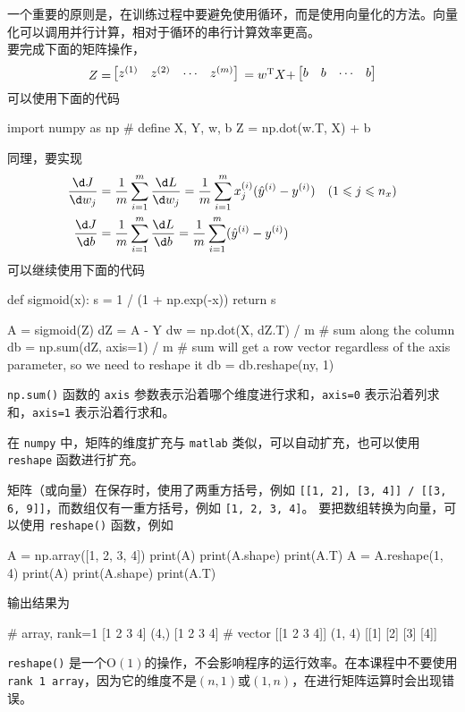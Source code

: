 一个重要的原则是，在训练过程中要避免使用循环，而是使用向量化的方法。向量化可以调用并行计算，相对于循环的串行计算效率更高。\\
要完成下面的矩阵操作，
\begin{equation}
    \vcenter{\hbox{$\vphantom{z^{(1)}}Z =$}}
    \begin{bmatrix}
        z^{(1)} & z^{(2)} & \cdots & z^{(m)}
    \end{bmatrix}
    \vcenter{\hbox{$\vphantom{z^{(1)}}= w^\mathrm{T} X + $}}
    \begin{bmatrix}
        b & b & \cdots & b
    \end{bmatrix}
\end{equation}
可以使用下面的代码
\begin{python}
import numpy as np
# define X, Y, w, b
Z = np.dot(w.T, X) + b
\end{python}
同理，要实现
\begin{equation}
    \begin{aligned}
        \frac{\d J}{\d w_j} &= \frac{1}{m} \sum_{i=1}^{m} \frac{\d L}{\d w_j} = \frac{1}{m} \sum_{i=1}^{m} x_j^{(i)} (\hat{y}^{(i)} - y^{(i)}) \quad (1 \leqslant j \leqslant n_x)\\
        \frac{\d J}{\d b} &= \frac{1}{m} \sum_{i=1}^{m} \frac{\d L}{\d b} = \frac{1}{m} \sum_{i=1}^{m} (\hat{y}^{(i)} - y^{(i)})
    \end{aligned}
\end{equation}
可以继续使用下面的代码
\begin{python}
def sigmoid(x):
    s = 1 / (1 + np.exp(-x))
    return s


A = sigmoid(Z)
dZ = A - Y
dw = np.dot(X, dZ.T) / m
# sum along the column
db = np.sum(dZ, axis=1) / m
# sum will get a row vector regardless of the axis parameter, so we need to reshape it
db = db.reshape(ny, 1)
\end{python}
\verb|np.sum()| 函数的 \verb|axis| 参数表示沿着哪个维度进行求和，\verb|axis=0| 表示沿着列求和，\verb|axis=1| 表示沿着行求和。

在 \verb|numpy| 中，矩阵的维度扩充与 \verb|matlab| 类似，可以自动扩充，也可以使用 \verb|reshape| 函数进行扩充。

矩阵（或向量）在保存时，使用了两重方括号，例如 \verb|[[1, 2], [3, 4]] / [[3, 6, 9]]|，而数组仅有一重方括号，例如 \verb|[1, 2, 3, 4]|。
要把数组转换为向量，可以使用 \verb|reshape()| 函数，例如
\begin{python}
A = np.array([1, 2, 3, 4])
print(A)
print(A.shape)
print(A.T)
A = A.reshape(1, 4)
print(A)
print(A.shape)
print(A.T)
\end{python}
输出结果为
\begin{python}
# array, rank=1
[1 2 3 4]
(4,) 
[1 2 3 4]
# vector
[[1 2 3 4]]
(1, 4) 
[[1]
 [2]
 [3]
 [4]]
\end{python}
\verb|reshape()| 是一个$\mathrm{O}(1)$的操作，不会影响程序的运行效率。在本课程中不要使用 \verb|rank 1 array|，因为它的维度不是$(n, 1)$或$(1, n)$，在进行矩阵运算时会出现错误。

